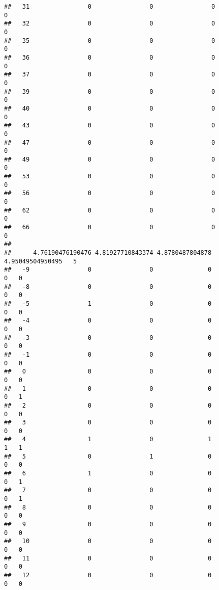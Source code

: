 \documentclass[]{article}
\begin{document}
\begin{verbatim}
##   31                0                0                0                0
##   32                0                0                0                0
##   35                0                0                0                0
##   36                0                0                0                0
##   37                0                0                0                0
##   39                0                0                0                0
##   40                0                0                0                0
##   43                0                0                0                0
##   47                0                0                0                0
##   49                0                0                0                0
##   53                0                0                0                0
##   56                0                0                0                0
##   62                0                0                0                0
##   66                0                0                0                0
##     
##      4.76190476190476 4.81927710843374 4.8780487804878 4.95049504950495   5
##   -9                0                0               0                0   0
##   -8                0                0               0                0   0
##   -5                1                0               0                0   0
##   -4                0                0               0                0   0
##   -3                0                0               0                0   0
##   -1                0                0               0                0   0
##   0                 0                0               0                0   0
##   1                 0                0               0                0   1
##   2                 0                0               0                0   0
##   3                 0                0               0                0   0
##   4                 1                0               1                1   1
##   5                 0                1               0                0   0
##   6                 1                0               0                0   1
##   7                 0                0               0                0   1
##   8                 0                0               0                0   0
##   9                 0                0               0                0   0
##   10                0                0               0                0   0
##   11                0                0               0                0   0
##   12                0                0               0                0   0

\end{verbatim}
\end{document}
